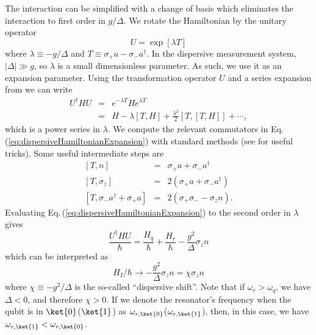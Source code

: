 The interaction can be simplified with a change of basis which eliminates the interaction to first order in $g/\Delta$.
We rotate the Hamiltonian by the unitary operator \begin{equation}
U = \exp \left[ \lambda T \right] \end{equation}
where $\lambda \equiv -g / \Delta$ and $T \equiv \sigma_+ a - \sigma_- a^{\dagger}$.
In the dispersive measurement system, $\left| \Delta \right| \gg g$, so $\lambda$ is a small dimensionless parameter.
As such, we use it as an expansion parameter.
Using the transformation operator $U$ and a series expansion from \citeinternaltype {} we can write \begin{eqnarray}
U^{\dagger}HU &=& e^{-\lambda T} H e^{\lambda T} \\
&=& H - \lambda \left[T, H \right] + \frac{\lambda^2}{2} \left[ T, \left[ T, H \right] \right] + \cdots , \label{eq:dispersiveHamiltonianExpansion} \end{eqnarray}
which is a power series in $\lambda$.
We compute the relevant commutators in Eq.\,(\ref{eq:dispersiveHamiltonianExpansion}) with standard methods (see \citeinternaltype {} for useful tricks).
Some useful intermediate steps are \begin{eqnarray}
\left[ T, n \right] &=& \sigma_+ a + \sigma_- a^{\dagger} \\
\left[ T, \sigma_z \right] &=& 2 \left( \sigma_+ a + \sigma_- a^{\dagger} \right) \\
\left[ T, \sigma_- a^{\dagger} + \sigma_+ a \right] &=& 2\left( \sigma_+ \sigma_- - \sigma_z n \right). \end{eqnarray}
Evaluating Eq.\,(\ref{eq:dispersiveHamiltonianExpansion}) to the second order in $\lambda$ gives \begin{equation}
\frac{U^{\dagger}HU}{\hbar} = \frac{H_q}{\hbar} + \frac{H_r}{\hbar} - \frac{g^2}{\Delta} \sigma_z n \end{equation}
which can be interpreted as \begin{equation}
H_I/\hbar \longrightarrow -\frac{g^2}{\Delta} \sigma_z n = \chi \sigma_z n \label{eq:dispersiveHamiltonianInteraction} \end{equation}
where $\chi \equiv - g^2/\Delta$ is the so-called ``dispersive shift''.
Note that if $\omega_r > \omega_q$, we have $\Delta < 0$, and therefore $\chi > 0$.
If we denote the resonator's frequency when the qubit is in $\ket{0}$($\ket{1}$) as $\omega_{r,\ket{0}}$($\omega_{r,\ket{1}}$), then, in this case, we have $\omega_{r,\ket{1}} < \omega_{r,\ket{0}}$.

